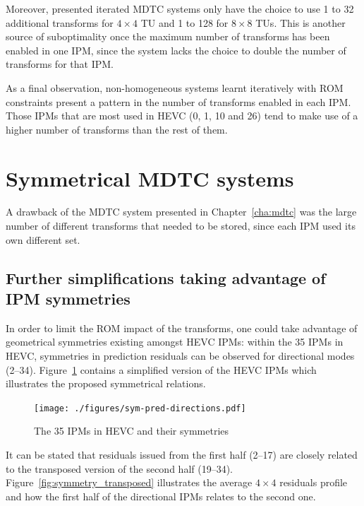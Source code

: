 \documentclass[11pt,a4paper,openright,twoside]{book}
\numberwithin{equation}{section} %
\numberwithin{figure}{section} %
\numberwithin{table}{section} %
\begin{document}
Moreover, presented iterated \ac{MDTC} systems only have the choice to use 1
to 32 additional transforms for $4\times4$ \acs{TU} and 1 to 128 for
$8\times8$ \acp{TU}.
This is another source of suboptimality once the maximum number of transforms
has been enabled in one \ac{IPM}, since the system lacks the choice to double
the number of transforms for that \ac{IPM}.

As a final observation, non-homogeneous systems learnt iteratively with
\acs{ROM} constraints present a pattern in the number of transforms enabled in
each \ac{IPM}.
Those \acp{IPM} that are most used in \ac{HEVC} (0, 1, 10 and 26) tend to make
use of a higher number of transforms than the rest of them.

\section{Symmetrical \acs{MDTC} systems}
\label{sec:sym_mdtc}

A drawback of the \ac{MDTC} system presented in Chapter~\ref{cha:mdtc} was
the large number of different transforms that needed to be stored, since each
\ac{IPM} used its own different set.

\subsection{Further simplifications taking advantage of \acs{IPM} symmetries}
\label{sub:further_simplifications_taking_advantage_of_ipm_symmetries}

In order to limit the \acs{ROM} impact of the transforms, one could take
advantage of geometrical symmetries existing amongst \ac{HEVC} \acp{IPM}:
within the 35 \acp{IPM} in \ac{HEVC}, symmetries in prediction residuals can
be observed for directional modes (2--34).
Figure~\ref{fig:sym_pred_directions} contains a simplified version of the
\ac{HEVC} \acp{IPM} which illustrates the proposed symmetrical relations.

\begin{figure}[t]
	\centering
	\texttt{[image: ./figures/sym-pred-directions.pdf]}
	\caption{The 35 \acsp{IPM} in \acs{HEVC} and their symmetries}
	\label{fig:sym_pred_directions}
\end{figure}

It can be stated that residuals issued from the first half (2--17) are closely
related to the transposed version of the second half (19--34).
Figure~\ref{fig:symmetry_transposed} illustrates the average $4\times4$
residuals profile and how the first half of the directional \acp{IPM} relates
to the second one.
\end{document}
